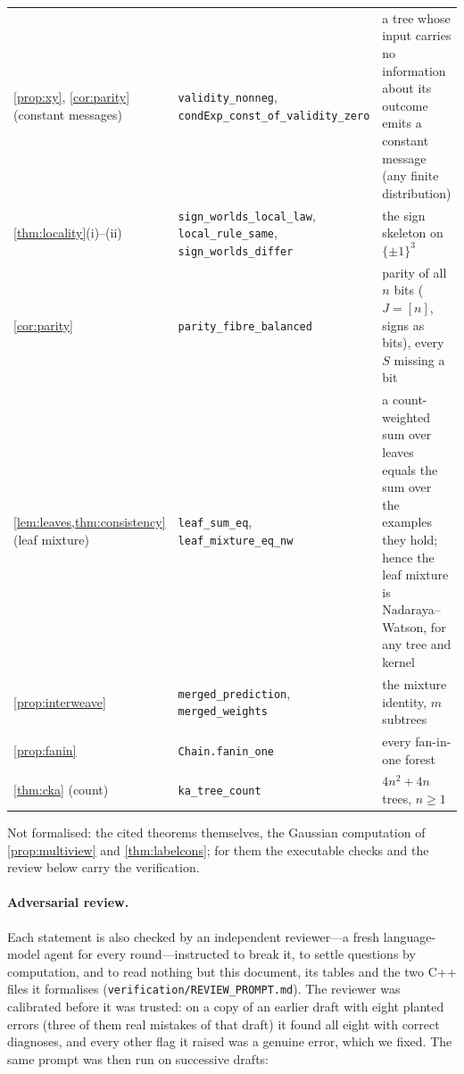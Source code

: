 \documentclass[11pt]{article}
\theoremstyle{definition}
\theoremstyle{remark}
\begin{document}
\begin{center}
\begin{tabular}{@{}p{3.3cm}p{5.4cm}p{6.4cm}@{}}
\cref{prop:xy}, \cref{cor:parity} (constant messages) & \texttt{validity\_nonneg}, \texttt{condExp\_const\_of\_validity\_zero} & a tree whose input carries no information about its outcome emits a constant message (any finite distribution)\\
\cref{thm:locality}(i)--(ii) & \texttt{sign\_worlds\_local\_law}, \texttt{local\_rule\_same}, \texttt{sign\_worlds\_differ} & the sign skeleton on $\{\pm1\}^3$\\
\cref{cor:parity} & \texttt{parity\_fibre\_balanced} & parity of all $n$ bits ($J=[n]$, signs as bits), every $S$ missing a bit\\
\cref{lem:leaves,thm:consistency} (leaf mixture) & \texttt{leaf\_sum\_eq}, \texttt{leaf\_mixture\_eq\_nw} & a count-weighted sum over leaves equals the sum over the examples they hold; hence the leaf mixture is Nadaraya--Watson, for any tree and kernel\\
\cref{prop:interweave} & \texttt{merged\_prediction}, \texttt{merged\_weights} & the mixture identity, $m$ subtrees\\
\cref{prop:fanin} & \texttt{Chain.fanin\_one} & every fan-in-one forest\\
\cref{thm:cka} (count) & \texttt{ka\_tree\_count} & $4n^2+4n$ trees, $n\ge1$\\
\bottomrule
\end{tabular}
\end{center}
Not formalised: the cited theorems themselves, the Gaussian computation of
\cref{prop:multiview} and \cref{thm:labelcons}; for them the executable checks and the
review below carry the verification.

\paragraph{Adversarial review.}
Each statement is also checked by an independent reviewer---a fresh language-model agent
for every round---instructed to break it, to settle questions by computation, and to
read nothing but this document, its tables and the two C++ files it formalises
(\nolinkurl{verification/REVIEW_PROMPT.md}).  The reviewer was calibrated before it was
trusted: on a copy of an earlier draft with eight planted errors (three of them real
mistakes of that draft) it found all eight with correct diagnoses, and every other flag it
raised was a genuine error, which we fixed.  The same prompt was then run on successive
drafts:
\end{document}
